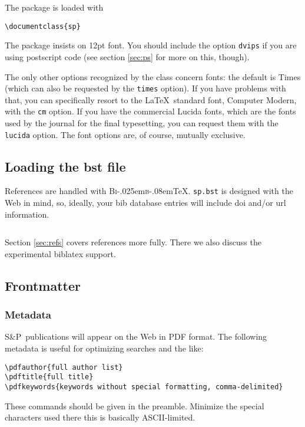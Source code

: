 \documentclass[lucida,final]{sp}
\makeatletter
\newcommand{\BibTeX}{B{\textsc i\kern-.025em\textsc b}\kern-.08em\TeX}
\newcommand{\SandP}{S\&P\@}
\newcommand{\spfile}[1]{\texttt{#1}}
\newcommand{\spcode}[1]{\texttt{#1}}
\makeatother
\begin{document}
The package is loaded with
%
\begin{Verbatim}
\documentclass{sp}
\end{Verbatim}
%
The package insists on 12pt font. You should include the option
\spcode{dvips} if you are using postscript code (see section
\ref{sec:ps} for more on this, though).

The only other options recognized by the class concern fonts: the
default is Times (which can also be requested by the \spcode{times}
option). If you have problems with that, you can specifically resort
to the \LaTeX\ standard font, Computer Modern, with the \spcode{cm}
option. If you have the commercial Lucida fonts, which are the fonts
used by the journal for the final typesetting, you can request them
with the \spcode{lucida} option. The font options are, of course,
mutually exclusive.


\subsection{Loading the bst file}

References are handled with \BibTeX. \spfile{sp.bst} is designed with
the Web in mind, so, ideally, your bib database entries will include
doi and/or url information.
%
\begin{Verbatim}

\end{Verbatim}
%
Section \ref{sec:refs} covers references more fully. There we also
discuss the experimental biblatex support.


\subsection{Frontmatter}\label{sec:frontmatter}

\subsubsection{Metadata}\label{sec:metadata}

\SandP\ publications will appear on the Web in PDF format.  The
following metadata is useful for optimizing searches and the like:
%
\begin{Verbatim}
\pdfauthor{full author list}
\pdftitle{full title}
\pdfkeywords{keywords without special formatting, comma-delimited}
\end{Verbatim}
%
These commands should be given in the preamble.  Minimize the special
characters used there \dash this is basically ASCII-limited.
\end{document}

